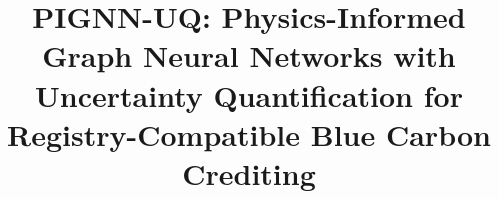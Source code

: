 \documentclass[conference]{IEEEtran}
\providecommand{\DIFaddbegin}{} %
\providecommand{\DIFaddend}{} %
\providecommand{\DIFdelbegin}{} %
\providecommand{\DIFdelend}{} %
\providecommand{\DIFscaledelfig}{0.5}
\newlength{\DIFdelgraphicswidth} %
\newlength{\DIFdelgraphicsheight} %
\providecommand{\DIFaddincludegraphics}[2][]{\DIFOincludegraphics[#1]{#2}} %
\providecommand{\DIFdelincludegraphics}[2][]{%
\sbox{\DIFdelgraphicsbox}{\DIFOincludegraphics[#1]{#2}}%
\settoboxwidth{\DIFdelgraphicswidth}{\DIFdelgraphicsbox} %
\settoboxtotalheight{\DIFdelgraphicsheight}{\DIFdelgraphicsbox} %
\scalebox{\DIFscaledelfig}{%
\parbox[b]{\DIFdelgraphicswidth}{\usebox{\DIFdelgraphicsbox}\\[-\baselineskip] \rule{\DIFdelgraphicswidth}{0em}}\llap{\resizebox{\DIFdelgraphicswidth}{\DIFdelgraphicsheight}{%
\setlength{\unitlength}{\DIFdelgraphicswidth}%
\begin{picture}(1,1)%
\thicklines\linethickness{2pt} %
{\color[rgb]{1,0,0}\put(0,0){\framebox(1,1){}}}%
{\color[rgb]{1,0,0}\put(0,0){\line( 1,1){1}}}%
{\color[rgb]{1,0,0}\put(0,1){\line(1,-1){1}}}%
\end{picture}%
}\hspace*{3pt}}} %
} %
\DeclareRobustCommand{\DIFaddbegin}{\DIFOaddbegin \let\includegraphics\DIFaddincludegraphics} %
\DeclareRobustCommand{\DIFaddend}{\DIFOaddend \let\includegraphics\DIFOincludegraphics} %
\DeclareRobustCommand{\DIFdelbegin}{\DIFOdelbegin \let\includegraphics\DIFdelincludegraphics} %
\DeclareRobustCommand{\DIFdelend}{\DIFOaddend \let\includegraphics\DIFOincludegraphics} %
\begin{document}
\DIFdelbegin %
\DIFdelend \DIFaddbegin \title{PIGNN-UQ: Physics-Informed Graph Neural Networks with Uncertainty Quantification for Registry-Compatible Blue Carbon Crediting}
\DIFaddend 

\author{
\DIFdelbegin %
\DIFdelend \DIFaddbegin {}
\DIFaddend }

\maketitle
\end{document}

